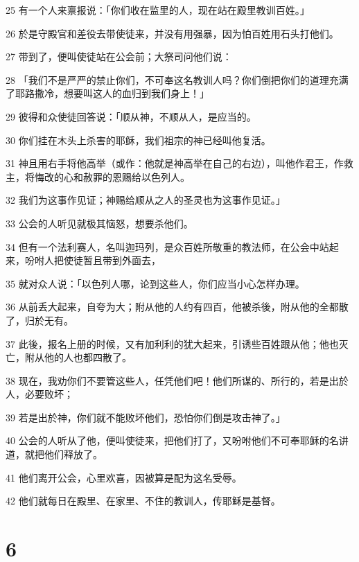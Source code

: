 \par 25 有一个人来禀报说：「你们收在监里的人，现在站在殿里教训百姓。」
\par 26 於是守殿官和差役去带使徒来，并没有用强暴，因为怕百姓用石头打他们。
\par 27 带到了，便叫使徒站在公会前；大祭司问他们说：
\par 28 「我们不是严严的禁止你们，不可奉这名教训人吗？你们倒把你们的道理充满了耶路撒冷，想要叫这人的血归到我们身上！」
\par 29 彼得和众使徒回答说：「顺从神，不顺从人，是应当的。
\par 30 你们挂在木头上杀害的耶稣，我们祖宗的神已经叫他复活。
\par 31 神且用右手将他高举（或作：他就是神高举在自己的右边），叫他作君王，作救主，将悔改的心和赦罪的恩赐给以色列人。
\par 32 我们为这事作见证；神赐给顺从之人的圣灵也为这事作见证。」
\par 33 公会的人听见就极其恼怒，想要杀他们。
\par 34 但有一个法利赛人，名叫迦玛列，是众百姓所敬重的教法师，在公会中站起来，吩咐人把使徒暂且带到外面去，
\par 35 就对众人说：「以色列人哪，论到这些人，你们应当小心怎样办理。
\par 36 从前丢大起来，自夸为大；附从他的人约有四百，他被杀後，附从他的全都散了，归於无有。
\par 37 此後，报名上册的时候，又有加利利的犹大起来，引诱些百姓跟从他；他也灭亡，附从他的人也都四散了。
\par 38 现在，我劝你们不要管这些人，任凭他们吧！他们所谋的、所行的，若是出於人，必要败坏；
\par 39 若是出於神，你们就不能败坏他们，恐怕你们倒是攻击神了。」
\par 40 公会的人听从了他，便叫使徒来，把他们打了，又吩咐他们不可奉耶稣的名讲道，就把他们释放了。
\par 41 他们离开公会，心里欢喜，因被算是配为这名受辱。
\par 42 他们就每日在殿里、在家里、不住的教训人，传耶稣是基督。

\chapter{6}

